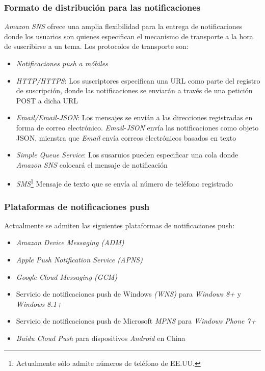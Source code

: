 \documentclass{article}
\begin{document}
\subsubsection{Formato de distribución para las notificaciones}
	\emph{Amazon SNS} ofrece una amplia flexibilidad para la entrega de notificaciones donde los usuarios son quienes especifican el mecanismo de transporte a la hora de suscribirse a un tema. Los protocolos de transporte son:
{\setlength{\parskip}{0mm} 
\begin{itemize}
	\item \textit{Notificaciones push a móbiles}
	\item \textit{HTTP/HTTPS}: Los suscriptores especifican una URL como parte del registro de suscripción, donde las notificaciones se enviarán a través de una petición POST a dicha URL
	\item \textit{Email/Email-JSON}: Los mensajes se envián a las direcciones registradas en forma de correo electrónico. \textit{Email-JSON} envía las notificaciones como objeto JSON, mienstra que \textit{Email} envía correos electrónicos basados en texto
	\item \textit{Simple Queue Service}: Los susaruios pueden especificar una cola donde \emph{Amazon SNS} colocará el mensaje de notificación
	\item \textit{SMS}\footnote{Actualmente sólo admite números de teléfono de EE.UU.} Mensaje de texto que se envía al número de teléfono registrado
\end{itemize}
}	

\subsubsection{Plataformas de notificaciones push}
Actualmente se admiten las siguientes plataformas de notificaciones push:
{\setlength{\parskip}{0mm} 
\begin{itemize}
	\item \emph{Amazon Device Messaging (ADM)}
	\item \emph{Apple Push Notification Service (APNS)}
	\item \emph{Google Cloud Messaging (GCM)}
	\item Servicio de notificaciones push de Windows \emph{(WNS)} para \emph{Windows 8+} y \emph{Windows 8.1+}
	\item Servicio de notificaciones push de Microsoft \emph{MPNS} para \emph{Windows Phone 7+}
	\item \emph{Baidu Cloud Push} para dispositivos \emph{Android} en China
\end{itemize}
}
\end{document}
